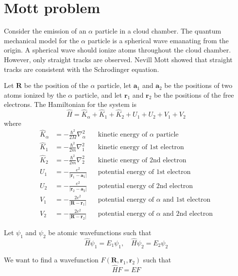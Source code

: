 \documentclass[12pt]{article}
\begin{document}
\section*{Mott problem}

Consider the emission of an $\alpha$ particle in a cloud chamber.
The quantum mechanical model for the $\alpha$ particle is a spherical wave emanating from the origin.
A spherical wave should ionize atoms throughout the cloud chamber.
However, only straight tracks are observed.
Nevill Mott showed that straight tracks are consistent with the Schrodinger equation.

\bigskip

Let $\mathbf R$ be the position of the $\alpha$ particle,
let $\mathbf a_1$ and $\mathbf a_2$ be the positions of two atoms ionized by the $\alpha$ particle,
and let $\mathbf r_1$ and $\mathbf r_2$ be the positions of the free electrons.
The Hamiltonian for the system is
\begin{equation*}
\hat H=\hat K_\alpha+\hat K_1+\hat K_2+U_1+U_2+V_1+V_2
\end{equation*}
where
\begin{align*}
\hat K_\alpha&=-\frac{\hbar^2}{2M}\nabla_\alpha^2 & & \text{kinetic energy of $\alpha$ particle}
\\[1ex]
\hat K_1&=-\frac{\hbar^2}{2m}\nabla_1^2 & & \text{kinetic energy of 1st electron}
\\[1ex]
\hat K_2&=-\frac{\hbar^2}{2m}\nabla_2^2 & & \text{kinetic energy of 2nd electron}
\\[1ex]
U_1&=-\frac{e^2}{|\mathbf r_1-\mathbf a_1|} & & \text{potential energy of 1st electron}
\\[1ex]
U_2&=-\frac{e^2}{|\mathbf r_2-\mathbf a_2|} & & \text{potential energy of 2nd electron}
\\[1ex]
V_1&=-\frac{2e^2}{|\mathbf R-\mathbf r_1|} & & \text{potential energy of $\alpha$ and 1st electron}
\\[1ex]
V_2&=-\frac{2e^2}{|\mathbf R-\mathbf r_2|} & & \text{potential energy of $\alpha$ and 2nd electron}
\end{align*}

Let $\psi_1$ and $\psi_2$ be atomic wavefunctions such that
\begin{equation*}
\hat H\psi_1=E_1\psi_1,
\quad
\hat H\psi_2=E_2\psi_2
\end{equation*}

We want to find a wavefunction $F(\mathbf R,\mathbf r_1,\mathbf r_2)$ such that
\begin{equation*}
\hat HF=EF
\end{equation*}
\end{document}
